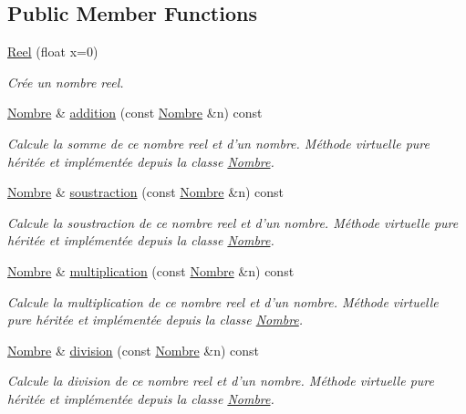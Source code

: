 \subsection*{\-Public \-Member \-Functions}
\begin{DoxyCompactItemize}
\item 
\hyperlink{classReel_a7415b4d1f436ac9499173ab43bc42fa4}{\-Reel} (float x=0)
\begin{DoxyCompactList}\small\item\em \-Crée un nombre reel. \end{DoxyCompactList}\item 
\hyperlink{classNombre}{\-Nombre} \& \hyperlink{classReel_a9bad18cd80469dfb8a16900f699abf2a}{addition} (const \hyperlink{classNombre}{\-Nombre} \&n) const 
\begin{DoxyCompactList}\small\item\em \-Calcule la somme de ce nombre reel et d'un nombre. \-Méthode virtuelle pure héritée et implémentée depuis la classe \hyperlink{classNombre}{\-Nombre}. \end{DoxyCompactList}\item 
\hyperlink{classNombre}{\-Nombre} \& \hyperlink{classReel_a5ab824ed0b29698abbe95d0edb671f97}{soustraction} (const \hyperlink{classNombre}{\-Nombre} \&n) const 
\begin{DoxyCompactList}\small\item\em \-Calcule la soustraction de ce nombre reel et d'un nombre. \-Méthode virtuelle pure héritée et implémentée depuis la classe \hyperlink{classNombre}{\-Nombre}. \end{DoxyCompactList}\item 
\hyperlink{classNombre}{\-Nombre} \& \hyperlink{classReel_a5bdfb76995bdea709a971fa2d134de46}{multiplication} (const \hyperlink{classNombre}{\-Nombre} \&n) const 
\begin{DoxyCompactList}\small\item\em \-Calcule la multiplication de ce nombre reel et d'un nombre. \-Méthode virtuelle pure héritée et implémentée depuis la classe \hyperlink{classNombre}{\-Nombre}. \end{DoxyCompactList}\item 
\hyperlink{classNombre}{\-Nombre} \& \hyperlink{classReel_a041d68cd7ee92fe30178ef1270d4628b}{division} (const \hyperlink{classNombre}{\-Nombre} \&n) const 
\begin{DoxyCompactList}\small\item\em \-Calcule la division de ce nombre reel et d'un nombre. \-Méthode virtuelle pure héritée et implémentée depuis la classe \hyperlink{classNombre}{\-Nombre}. \end{DoxyCompactList}\item 

\end{DoxyCompactItemize}
